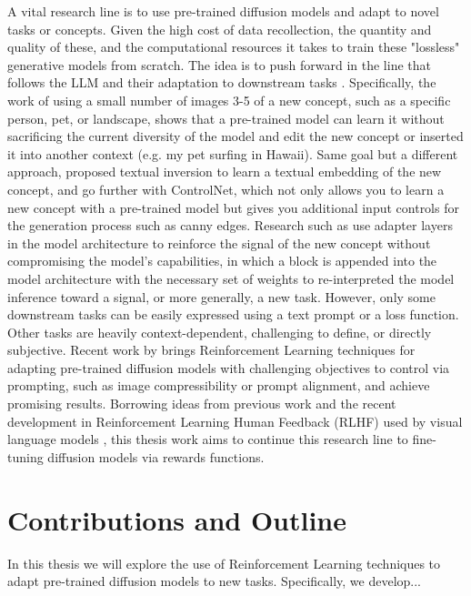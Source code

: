 A vital research line is to use pre-trained diffusion models and adapt to novel tasks or concepts. Given the high cost of data recollection, the quantity and quality of these, and the computational resources it takes to train these "lossless" generative models from scratch. The idea is to push forward in the line that follows the LLM and their adaptation to downstream tasks \citep{Radford2019LanguageMA}. Specifically, the work of \cite{ruiz2023dreambooth} using a small number of images 3-5 of a new concept, such as a specific person, pet, or landscape, shows that a pre-trained model can learn it without sacrificing the current diversity of the model and edit the new concept or inserted it into another context (e.g. my pet surfing in Hawaii). Same goal but a different approach, \cite{gal2022image} proposed textual inversion to learn a textual embedding of the new concept, and \cite{zhang2023adding} go further with ControlNet, which not only allows you to learn a new concept with a pre-trained model but gives you additional input controls for the generation process such as canny edges. Research such as \cite{shi2023instantbooth} use adapter layers in the model architecture to reinforce the signal of the new concept without compromising the model's capabilities, in which a block is appended into the model architecture with the necessary set of weights to re-interpreted the model inference toward a signal, or more generally, a new task. However, only some downstream tasks can be easily expressed using a text prompt or a loss function. Other tasks are heavily context-dependent, challenging to define, or directly subjective. Recent work by \cite{black2023training} brings Reinforcement Learning techniques for adapting pre-trained diffusion models with challenging objectives to control via prompting, such as image compressibility or prompt alignment, and achieve promising results. Borrowing ideas from previous work and the recent development in Reinforcement Learning Human Feedback (RLHF) used by visual language models \citep{lee2023aligning}, this thesis work aims to continue this research line to fine-tuning diffusion models via rewards functions. \\

\section{Contributions and Outline}

In this thesis we will explore the use of Reinforcement Learning techniques to adapt pre-trained diffusion models to new tasks. Specifically, we develop...\\

